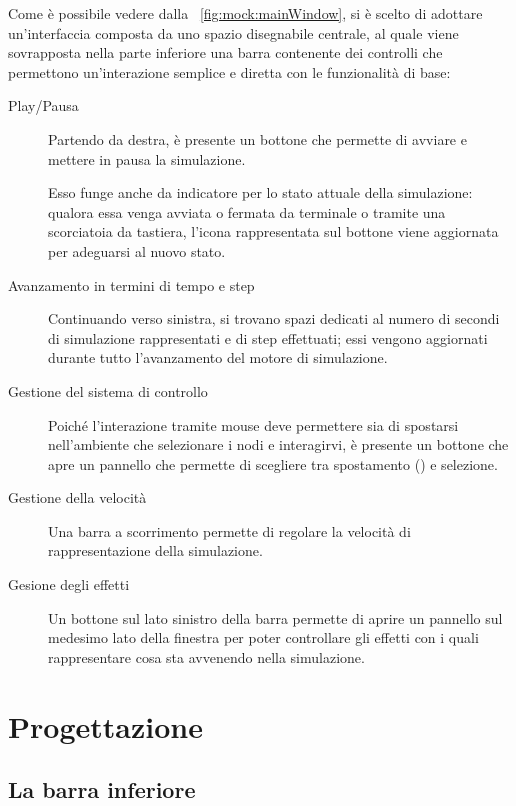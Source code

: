         Come è possibile vedere dalla \figurename~\vref{fig:mock:mainWindow}, si è scelto di adottare un'interfaccia composta da uno spazio disegnabile centrale, al quale viene sovrapposta nella parte inferiore una barra contenente dei controlli che permettono un'interazione semplice e diretta con le funzionalità di base:

        \begin{description}
          \item [Play/Pausa] Partendo da destra, è presente un bottone che permette di avviare e mettere in pausa la simulazione.

          Esso funge anche da indicatore per lo stato attuale della simulazione: qualora essa venga avviata o fermata da terminale o tramite una scorciatoia da tastiera, l'icona rappresentata sul bottone viene aggiornata per adeguarsi al nuovo stato.

          \item[Avanzamento in termini di tempo e step] Continuando verso sinistra, si trovano spazi dedicati al numero di secondi di simulazione rappresentati e di step effettuati; essi vengono aggiornati durante tutto l'avanzamento del motore di simulazione.

          \item[Gestione del sistema di controllo] Poiché l'interazione tramite mouse deve permettere sia di spostarsi nell'ambiente che selezionare i nodi e interagirvi, è presente un bottone che apre un pannello che permette di scegliere tra spostamento () e selezione.

          \item[Gestione della velocità] Una barra a scorrimento permette di regolare la velocità di rappresentazione della simulazione.

          \item[Gesione degli effetti] Un bottone sul lato sinistro della barra permette di aprire un pannello sul medesimo lato della finestra per poter controllare gli effetti con i quali rappresentare cosa sta avvenendo nella simulazione.

        \end{description}

    \section{Progettazione}\label{sec:progettazione}
        \subsection{La barra inferiore}\label{sub:barra}
